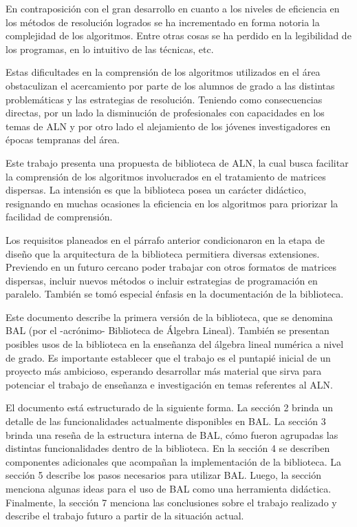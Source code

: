 \documentclass{cacic06}
\begin{document}
En contraposición con el gran desarrollo en cuanto a los niveles de eficiencia en los métodos de resolución logrados se ha incrementado en forma notoria la complejidad de los algoritmos. 
Entre otras cosas se ha perdido en  la legibilidad de los programas, en lo intuitivo de las técnicas, etc.

Estas dificultades en la comprensión de los algoritmos utilizados en el área obstaculizan el acercamiento por parte de los alumnos de grado a las distintas problemáticas y las estrategias de resolución. 
Teniendo como consecuencias directas, por un lado la disminución de profesionales con capacidades en los temas de ALN y por otro lado el alejamiento de los jóvenes investigadores en épocas tempranas del área.

Este trabajo presenta una propuesta de biblioteca de ALN, la cual busca facilitar la comprensión de los algoritmos involucrados en el tratamiento de matrices dispersas.
La intensión es que la biblioteca posea un carácter didáctico, resignando en muchas ocasiones la eficiencia en los algoritmos para priorizar la facilidad de comprensión.

Los requisitos planeados en el párrafo anterior condicionaron en la etapa de diseño que la arquitectura de la biblioteca permitiera diversas extensiones.
Previendo en un futuro cercano poder trabajar con otros formatos de matrices dispersas, incluir nuevos métodos o incluir estrategias de programación en paralelo. 
También se tomó especial énfasis en la documentación de la biblioteca.

Este documento describe la primera versión de la biblioteca, que se denomina BAL (por el -acrónimo- Biblioteca de Álgebra Lineal).
También se presentan posibles usos de la biblioteca en la enseñanza del álgebra lineal numérica a nivel de grado. 
Es importante establecer que el trabajo es el puntapié inicial de un proyecto más ambicioso, 
esperando desarrollar más material que sirva para potenciar el trabajo de enseñanza e investigación en temas referentes al ALN.

El documento está estructurado de la siguiente forma. La sección 2 brinda un detalle de las funcionalidades actualmente disponibles en BAL. 
La sección 3 brinda una reseña de la estructura interna de BAL, cómo fueron agrupadas las distintas funcionalidades dentro de la biblioteca.
En la sección 4 se describen componentes adicionales que acompañan la implementación de la biblioteca. 
La sección 5 describe los pasos necesarios para utilizar BAL.
Luego, la sección menciona algunas ideas para el uso de BAL como una herramienta didáctica.  
Finalmente, la sección 7 menciona las conclusiones sobre el trabajo realizado y describe el trabajo futuro a partir de la situación actual.
\end{document}
